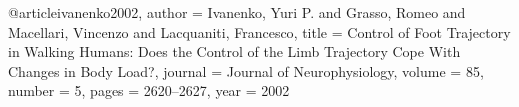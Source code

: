 @article{ivanenko2002,
  author  = {Ivanenko, Yuri P. and Grasso, Romeo and Macellari, Vincenzo and Lacquaniti, Francesco},
  title   = {Control of Foot Trajectory in Walking Humans: Does the Control of the Limb Trajectory Cope With Changes in Body Load?},
  journal = {Journal of Neurophysiology},
  volume  = {85},
  number  = {5},
  pages   = {2620--2627},
  year    = {2002}
}


